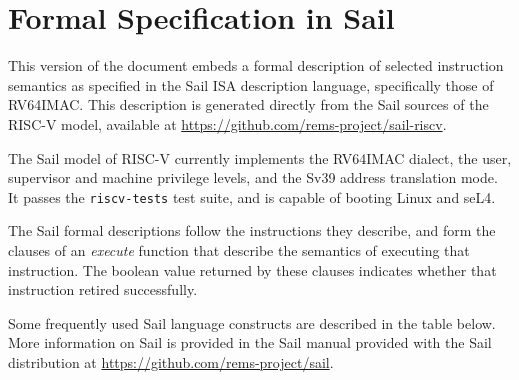 \section{Formal Specification in Sail}
\label{sect:user-sail-model}

This version of the document embeds a formal description of selected
instruction semantics as specified in the Sail ISA description
language\cite{sail-site}, specifically those of RV64IMAC.  This
description is generated directly from the Sail sources of the RISC-V
model, available at \url{https://github.com/rems-project/sail-riscv}.

The Sail model of RISC-V currently implements the RV64IMAC dialect,
the user, supervisor and machine privilege levels, and the Sv39
address translation mode.  It passes the \texttt{riscv-tests} test
suite, and is capable of booting Linux and seL4.

The Sail formal descriptions follow the instructions they describe, and
form the clauses of an \textit{execute} function that describe the
semantics of executing that instruction.  The boolean value returned
by these clauses indicates whether that instruction retired
successfully.

Some frequently used Sail language constructs are described in the
table below.  More information on Sail is provided in the Sail manual
provided with the Sail distribution at
\url{https://github.com/rems-project/sail}.


